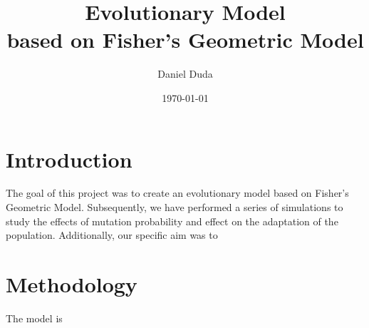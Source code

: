 \documentclass{article}
\title{Evolutionary Model \\
    based on Fisher's Geometric Model}
\author{Daniel Duda}
\date{\today}
\begin{document}
\maketitle

\section{Introduction}

The goal of this project was to create an evolutionary model based on Fisher's Geometric Model. Subsequently, we have
performed a series of simulations to study the effects of mutation probability and effect on the adaptation of the population.
Additionally, our specific aim was to 


\section{Methodology}

The model is
\end{document}
